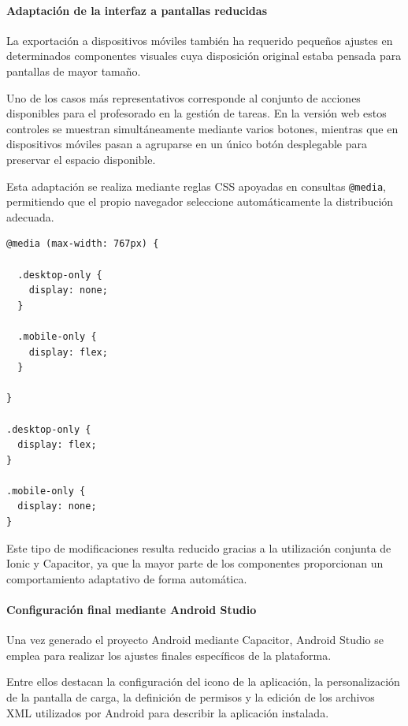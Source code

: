 \paragraph{Adaptación de la interfaz a pantallas reducidas}

La exportación a dispositivos móviles también ha requerido pequeños ajustes en determinados componentes visuales cuya disposición original estaba pensada para pantallas de mayor tamaño.

Uno de los casos más representativos corresponde al conjunto de acciones disponibles para el profesorado en la gestión de tareas. En la versión web estos controles se muestran simultáneamente mediante varios botones, mientras que en dispositivos móviles pasan a agruparse en un único botón desplegable para preservar el espacio disponible.

Esta adaptación se realiza mediante reglas CSS apoyadas en consultas \texttt{@media}, permitiendo que el propio navegador seleccione automáticamente la distribución adecuada.

\begin{Verbatim}[frame=single, fontsize=\small, xleftmargin=10pt, xrightmargin=10pt]
@media (max-width: 767px) {

  .desktop-only {
    display: none;
  }

  .mobile-only {
    display: flex;
  }

}

.desktop-only {
  display: flex;
}

.mobile-only {
  display: none;
}
\end{Verbatim}

Este tipo de modificaciones resulta reducido gracias a la utilización conjunta de Ionic y Capacitor, ya que la mayor parte de los componentes proporcionan un comportamiento adaptativo de forma automática.

\paragraph{Configuración final mediante Android Studio}

Una vez generado el proyecto Android mediante Capacitor, Android Studio se emplea para realizar los ajustes finales específicos de la plataforma.

Entre ellos destacan la configuración del icono de la aplicación, la personalización de la pantalla de carga, la definición de permisos y la edición de los archivos XML utilizados por Android para describir la aplicación instalada.

